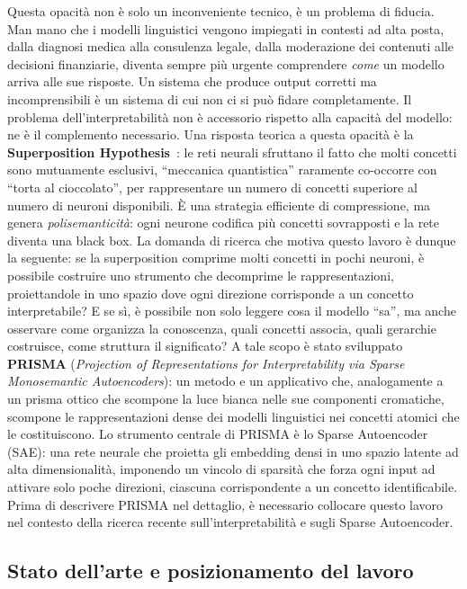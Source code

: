 Questa opacità non è solo un inconveniente tecnico, è un problema di fiducia. Man mano che i modelli linguistici vengono impiegati in contesti ad alta posta, dalla diagnosi medica alla consulenza legale, dalla moderazione dei contenuti alle decisioni finanziarie, diventa sempre più urgente comprendere \textit{come} un modello arriva alle sue risposte. Un sistema che produce output corretti ma incomprensibili è un sistema di cui non ci si può fidare completamente. Il problema dell'interpretabilità non è accessorio rispetto alla capacità del modello: ne è il complemento necessario.
Una risposta teorica a questa opacità è la \textbf{Superposition Hypothesis}~\parencite{elhage2022toy}: le reti neurali sfruttano il fatto che molti concetti sono mutuamente esclusivi, ``meccanica quantistica'' raramente co-occorre con ``torta al cioccolato'', per rappresentare un numero di concetti superiore al numero di neuroni disponibili. È una strategia efficiente di compressione, ma genera \textit{polisemanticità}: ogni neurone codifica più concetti sovrapposti e la rete diventa una black box.
La domanda di ricerca che motiva questo lavoro è dunque la seguente: se la superposition comprime molti concetti in pochi neuroni, è possibile costruire uno strumento che decomprime le rappresentazioni, proiettandole in uno spazio dove ogni direzione corrisponde a un concetto interpretabile? E se sì, è possibile non solo leggere cosa il modello ``sa'', ma anche osservare come organizza la conoscenza, quali concetti associa, quali gerarchie costruisce, come struttura il significato?
A tale scopo è stato sviluppato \textbf{PRISMA} (\textit{Projection of Representations for Interpretability via Sparse Monosemantic Autoencoders}): un metodo e un applicativo che, analogamente a un prisma ottico che scompone la luce bianca nelle sue componenti cromatiche, scompone le rappresentazioni dense dei modelli linguistici nei concetti atomici che le costituiscono. Lo strumento centrale di PRISMA è lo Sparse Autoencoder (SAE): una rete neurale che proietta gli embedding densi in uno spazio latente ad alta dimensionalità, imponendo un vincolo di sparsità che forza ogni input ad attivare solo poche direzioni, ciascuna corrispondente a un concetto identificabile.
Prima di descrivere PRISMA nel dettaglio, è necessario collocare questo lavoro nel contesto della ricerca recente sull'interpretabilità e sugli Sparse Autoencoder.

\subsection{Stato dell'arte e posizionamento del lavoro}
\label{subsec:01_stato_dell_arte}

